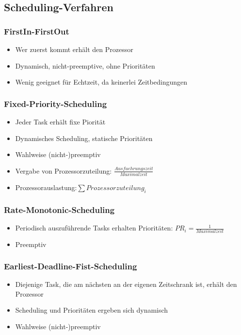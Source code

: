 \subsection{Scheduling-Verfahren}

\subsubsection{FirstIn-FirstOut}
\begin{itemize}
	\item Wer zuerst kommt erhält den Prozessor
	\item Dynamisch, nicht-preemptive, ohne Prioritäten
	\item Wenig geeignet für Echtzeit, da keinerlei Zeitbedingungen
\end{itemize}

\subsubsection{Fixed-Priority-Scheduling}
\begin{itemize}
	\item Jeder Task erhält fixe Piorität
	\item Dynamisches Scheduling, statische Prioritäten
	\item Wahlweise (nicht-)preemptiv
	\item Vergabe von Prozessorzuteilung: \(\frac{Ausfuehrungszeit}{Maximalzeit}\)
	\item Prozessorauslastung:\(\sum Prozessorzuteilung_i\)
\end{itemize}

\subsubsection{Rate-Monotonic-Scheduling}
\begin{itemize}
	\item Periodisch auszuführende Tasks erhalten Prioritäten: \(PR_i =\frac{1}{Maximalzeit}\) 
	\item Preemptiv
\end{itemize}

\subsubsection{Earliest-Deadline-Fist-Scheduling}
\begin{itemize}
	\item Diejenige Task, die am nächsten an der eigenen Zeitschrank ist, erhält den Prozessor
	\item Scheduling und Prioritäten ergeben sich dynamisch
	\item Wahlweise (nicht-)preemptiv
\end{itemize}

